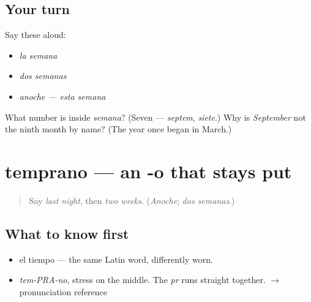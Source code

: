 \subsection*{Your turn}
Say these aloud:

\begin{itemize}
\raggedright
  \item \emph{la semana}
  \item \emph{dos semanas}
  \item \emph{anoche — esta semana}
\end{itemize}

\begin{tcolorbox}[breakable,colback=teal!4,colframe=teal!35!black,title={Before you move on}]
What number is inside \emph{semana}? (Seven — \emph{septem}, \emph{siete}.) Why is \emph{September} not the ninth month by name? (The year once began in March.)
\end{tcolorbox}
\section[temprano]{temprano — an -o that stays put}

\label{lesson:ES-C322-temprano}



\begin{quote}
Say \emph{last night}, then \emph{two weeks}. (\emph{Anoche}; \emph{dos semanas}.)
\end{quote}

\subsection*{What to know first}
\begin{itemize}
\raggedright
  \item el tiempo — the same Latin word, differently worn.
\end{itemize}

\begin{sounds}
\begin{itemize}
\raggedright
  \item \emph{tem-PRA-no}, stress on the middle. The \emph{pr} runs straight together. $\to$ pronunciation reference
\end{itemize}
\end{sounds}


